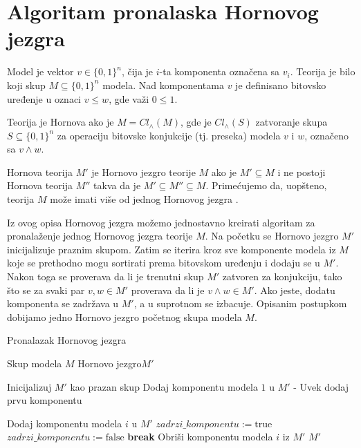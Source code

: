 \documentclass[12pt,oneside]{memoir}
\begin{document}
\section{Algoritam pronalaska Hornovog jezgra}

Model je vektor $v \in \{0,1\}^n$, čija je $i$-ta komponenta označena sa $v_i$. Teorija je bilo koji skup $M \subseteq \{0,1\}^n$ modela. Nad komponentama $v$ je definisano bitovsko uređenje u oznaci $v \leq w$, gde važi $0 \leq 1$. 

Teorija je Hornova ako je $M = Cl_{\land}(M)$, gde je $Cl_{\land}(S)$ zatvoranje skupa $S \subseteq \{0,1\}^n$ za operaciju bitovske konjukcije (tj. preseka) modela $v$ i $w$, označeno sa $v \land w$.

Hornova teorija $M'$ je Hornovo jezgro teorije $M$ ako je $M' \subseteq M$ i ne postoji Hornova teorija $M''$ takva da je $M' \subseteq M'' \subseteq M$. Primećujemo da, uopšteno, teorija $M$ može imati više od jednog Hornovog jezgra \cite{doc1}.

Iz ovog opisa Hornovog jezgra možemo jednostavno kreirati algoritam za pronalaženje jednog Hornovog jezgra teorije $M$. Na početku se Hornovo jezgro $M'$ inicijalizuje praznim skupom. Zatim se iterira kroz sve komponente modela iz $M$ koje se prethodno mogu sortirati prema bitovskom uređenju i dodaju se u $M'$. Nakon toga se proverava da li je trenutni skup $M'$ zatvoren za konjukciju, tako što se za svaki par $v, w \in M'$ proverava da li je $v \land w \in M'$. Ako jeste, dodatu komponenta se zadržava u $M'$, a u suprotnom se izbacuje. Opisanim postupkom dobijamo jedno Hornovo jezgro početnog skupa modela $M$.\\

\begin{algorithm}
    \caption{Pronalazak Hornovog jezgra}
    \renewcommand{\algorithmicrequire}{\textbf{Input:}}
    \renewcommand{\algorithmicensure}{\textbf{Output:}}
    \begin{algorithmic}[1]
        \REQUIRE Skup modela $M$
        \ENSURE Hornovo jezgro$M'$
    
        \STATE Inicijalizuj $M'$ kao prazan skup
        \STATE Dodaj komponentu modela $1$ u $M'$ - Uvek dodaj prvu komponentu

    
            \STATE Dodaj komponentu modela $i$ u $M'$
            \STATE $zadrzi\_komponentu := \text{true}$
                    \STATE $zadrzi\_komponentu:= \text{false}$
                    \STATE \textbf{break}
                \ENDIF
            \ENDFOR
                \STATE Obriši komponentu modela $i$ iz $M'$
            \ENDIF
        \ENDFOR
        \RETURN $M'$
        \end{algorithmic}
\end{algorithm}
\end{document}
